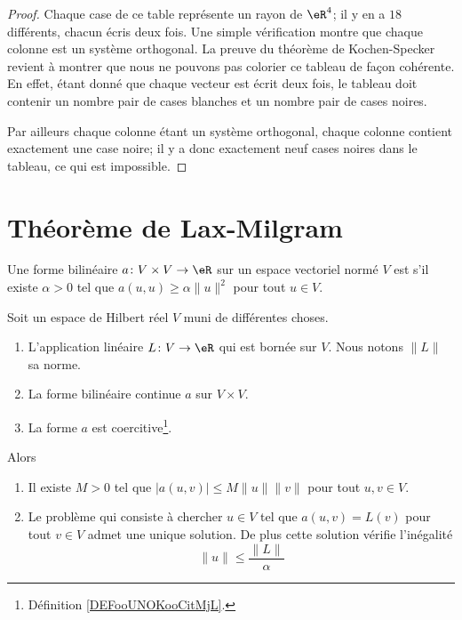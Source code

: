 \begin{proof}
    Chaque case de ce table représente un rayon de \( \eR^4\); il y en a \( 18\) différents, chacun écris deux fois. Une simple vérification montre que chaque colonne est un système orthogonal. La preuve du théorème de Kochen-Specker revient à montrer que nous ne pouvons pas colorier ce tableau de façon cohérente. En effet, étant donné que chaque vecteur est écrit deux fois, le tableau doit contenir un nombre pair de cases blanches et un nombre pair de cases noires.

    Par ailleurs chaque colonne étant un système orthogonal, chaque colonne contient exactement une case noire; il y a donc exactement neuf cases noires dans le tableau, ce qui est impossible.

\end{proof}

\section{Théorème de Lax-Milgram}

\begin{definition}      \label{DEFooUNOKooCitMjL}
    Une forme bilinéaire \( a\colon V\times V\to \eR\) sur un espace vectoriel normé \( V\) est  s'il existe \( \alpha>0\) tel que \(  a(u,u)\geq \alpha\| u \|^2 \) pour tout \( u\in V\).
\end{definition}

\begin{theorem}       \label{THOooLLUXooHyqmVL}
    Soit un espace de Hilbert réel \( V\) muni de différentes choses.
    \begin{enumerate}
        \item
            L'application linéaire \( L\colon V\to \eR\) qui est bornée sur \( V\). Nous notons \( \| L \|\) sa norme.
        \item
            La forme bilinéaire continue \( a\) sur \( V\times V\). 
        \item
            La forme \( a\) est coercitive\footnote{Définition \ref{DEFooUNOKooCitMjL}.}.
    \end{enumerate}
    Alors 
    \begin{enumerate}
        \item
            Il existe \( M>0\) tel que \( | a(u,v) |\leq M\| u \|\| v \|\) pour tout \( u,v\in V\).
        \item
            Le problème qui consiste à chercher \( u\in V\) tel que \( a(u,v)=L(v)\) pour tout \( v\in V\) admet une unique solution. De plus cette solution vérifie l'inégalité
    \begin{equation}        \label{EQooUAYSooKYyQBU}
        \| u \|\leq \frac{ \| L \| }{ \alpha }
    \end{equation}
    \end{enumerate}
\end{theorem}

